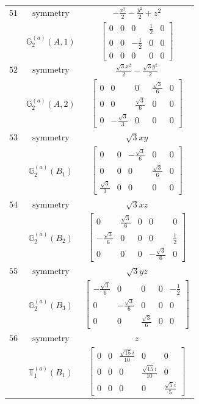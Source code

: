 \documentclass[fleqn,8pt,landscape]{jsarticle}
\begin{document}
\begin{longtable}{ccc}
$ 51 $ & $ \text{symmetry} $ & $ - \frac{x^{2}}{2} - \frac{y^{2}}{2} + z^{2} $ \\
$  $ & $ \mathbb{G}_{2}^{(a)}(A,1) $ & $ \begin{bmatrix} 0 & 0 & 0 & \frac{1}{2} & 0 \\ 0 & 0 & - \frac{1}{2} & 0 & 0 \\ 0 & 0 & 0 & 0 & 0 \end{bmatrix} $ \\ \hline
$ 52 $ & $ \text{symmetry} $ & $ \frac{\sqrt{3} x^{2}}{2} - \frac{\sqrt{3} y^{2}}{2} $ \\
$  $ & $ \mathbb{G}_{2}^{(a)}(A,2) $ & $ \begin{bmatrix} 0 & 0 & 0 & \frac{\sqrt{3}}{6} & 0 \\ 0 & 0 & \frac{\sqrt{3}}{6} & 0 & 0 \\ 0 & - \frac{\sqrt{3}}{3} & 0 & 0 & 0 \end{bmatrix} $ \\ \hline
$ 53 $ & $ \text{symmetry} $ & $ \sqrt{3} x y $ \\
$  $ & $ \mathbb{G}_{2}^{(a)}(B_{1}) $ & $ \begin{bmatrix} 0 & 0 & - \frac{\sqrt{3}}{6} & 0 & 0 \\ 0 & 0 & 0 & \frac{\sqrt{3}}{6} & 0 \\ \frac{\sqrt{3}}{3} & 0 & 0 & 0 & 0 \end{bmatrix} $ \\ \hline
$ 54 $ & $ \text{symmetry} $ & $ \sqrt{3} x z $ \\
$  $ & $ \mathbb{G}_{2}^{(a)}(B_{2}) $ & $ \begin{bmatrix} 0 & \frac{\sqrt{3}}{6} & 0 & 0 & 0 \\ - \frac{\sqrt{3}}{6} & 0 & 0 & 0 & \frac{1}{2} \\ 0 & 0 & 0 & - \frac{\sqrt{3}}{6} & 0 \end{bmatrix} $ \\ \hline
$ 55 $ & $ \text{symmetry} $ & $ \sqrt{3} y z $ \\
$  $ & $ \mathbb{G}_{2}^{(a)}(B_{3}) $ & $ \begin{bmatrix} - \frac{\sqrt{3}}{6} & 0 & 0 & 0 & - \frac{1}{2} \\ 0 & - \frac{\sqrt{3}}{6} & 0 & 0 & 0 \\ 0 & 0 & \frac{\sqrt{3}}{6} & 0 & 0 \end{bmatrix} $ \\ \hline
$ 56 $ & $ \text{symmetry} $ & $ z $ \\
$  $ & $ \mathbb{T}_{1}^{(a)}(B_{1}) $ & $ \begin{bmatrix} 0 & 0 & \frac{\sqrt{15} i}{10} & 0 & 0 \\ 0 & 0 & 0 & \frac{\sqrt{15} i}{10} & 0 \\ 0 & 0 & 0 & 0 & \frac{\sqrt{5} i}{5} \end{bmatrix} $ \\ \hline

\end{longtable}
\end{document}
